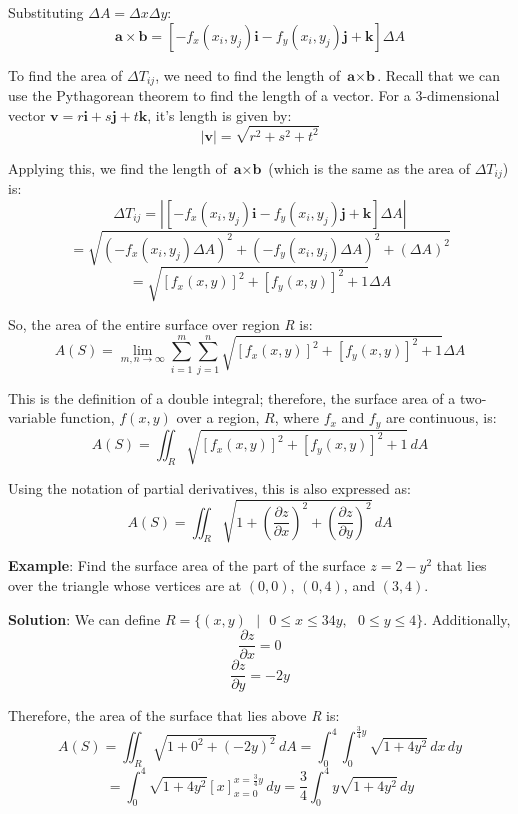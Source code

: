 Substituting $\Delta A = \Delta x \Delta y$:
$$\textbf{a} \times \textbf{b} = \left[ -f_x(x_i, y_j) \textbf{i} - f_y(x_i, 
y_j) \textbf{j} + \textbf{k} \right] \Delta A$$

To find the area of $\Delta T_{ij}$, we need to find the length of $\textbf{a} 
\times \textbf{b}$. Recall that we can use the Pythagorean theorem to find the 
length of a vector. For a 3-dimensional vector $\textbf{v} = r \textbf{i} + s 
\textbf{j} + t \textbf{k}$, it's length is given by:
$$|\textbf{v}| = \sqrt{r^2 + s^2 + t^2}$$

Applying this, we find the length of $\textbf{a} \times \textbf{b}$ (which is 
the same as the area of $\Delta T_{ij}$) is:
$$\Delta T_{ij} = |\left[ -f_x(x_i, y_j) \textbf{i} - f_y(x_i, y_j) \textbf{j} 
+ \textbf{k} \right] \Delta A|$$
$$= \sqrt{\left(-f_x(x_i, y_j) \Delta A \right)^2 + \left( - f_y(x_i, y_j) 
\Delta A \right)^2 + \left( \Delta A \right)^2}$$
$$= \sqrt{\left[ f_x(x, y)\right]^2 + \left[f_y(x, y) \right]^2 + 1} \Delta A$$

So, the area of the entire surface over region \textit{R} is:
$$A(S) = \lim_{m, n \to \infty} \sum_{i = 1}^m \sum_{j = 1}^n \sqrt{\left[ f_x(
x, y)\right]^2 + \left[f_y(x, y) \right]^2 + 1} \Delta A$$

This is the definition of a double integral; therefore, the surface area of 
a two-variable function, $f(x, y)$ over a region, $R$, where $f_x$ and $f_y$ 
are continuous, is:
$$A(S) = \iint_{\textit{R}} \sqrt{\left[ f_x(x, y)\right]^2 + \left[f_y(x, y) 
\right]^2 + 1}\,dA$$

Using the notation of partial derivatives, this is also expressed as:
$$A(S) = \iint_{\textit{R}} \sqrt{1 + \left( \frac{\partial z}{\partial x} 
\right)^2 + \left( \frac{\partial z}{\partial y} \right)^2}\,dA$$

\textbf{Example}: Find the surface area of the part of the surface $z = 2 - 
y^2$ that lies over the triangle whose vertices are at $(0, 0)$, $(0, 4)$, and 
$(3, 4)$. 

\textbf{Solution}: We can define $\textit{R} = \{(x, y)\text{ }|\text{ }0 \leq 
x \leq {3}{4}y,\text{ }0 \leq y \leq 4\}$. Additionally, 
$$\frac{\partial z}{\partial x} = 0$$
$$\frac{\partial z}{\partial y} = -2y$$

Therefore, the area of the surface that lies above \textit{R} is:
$$A(S) = \iint_{\textit{R}} \sqrt{1 + 0^2 + \left( -2y \right)^2}\,dA = 
\int_0^4 \int_0^{\frac{3}{4}y} \sqrt{1 + 4y^2}\,dx\,dy$$
$$= \int_0^4 \sqrt{1 + 4y^2} \left[ x \right]_{x = 0}^{x = \frac{3}{4}y}\,dy 
= \frac{3}{4} \int_0^4 y \sqrt{1 + 4y^2}\,dy$$

